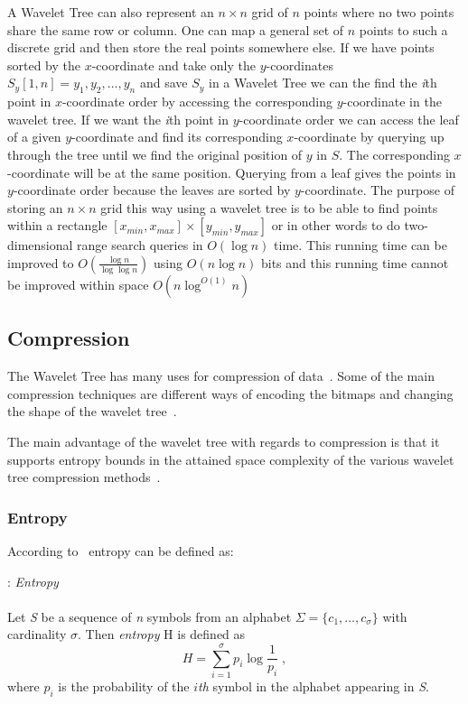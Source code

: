 A Wavelet Tree can also represent an $n \times n$ grid of $n$ points where no two points share the same row or column. 
One can map a general set of $n$ points to such a discrete grid and then store the real points somewhere else. If we have points sorted by the $x$-coordinate and take only the $y$-coordinates $S_y[1,n] = y_1,y_2,...,y_n$ and save $S_y$ in a Wavelet Tree we can the find the \textit{i}th point in $x$-coordinate order by accessing the corresponding $y$-coordinate in the wavelet tree. 
If we want the \textit{i}th point in $y$-coordinate order we can access the leaf of a given $y$-coordinate and find its corresponding $x$-coordinate by querying up through the tree until we find the original position of $y$ in $S$. 
The corresponding $x$-coordinate will be at the same position.
Querying from a leaf gives the points in $y$-coordinate order because the leaves are sorted by $y$-coordinate.
The purpose of storing an $n \times n$ grid this way using a wavelet tree is to be able to find points within a rectangle $[ x_{min}, x_{max} ] \times [ y_{min}, y_{max} ]$ or in other words to do two-dimensional range search queries in $O(\log n)$ time.
This running time can be improved to $O(\frac{\log n}{\log \log n})$ using $O(n \log n)$ bits and this running time cannot be improved within space $O(n \log^{O(1)} n)$ 

\subsection{Compression}
The Wavelet Tree has many uses for compression of data~.
Some of the main compression techniques are different ways of encoding the bitmaps and changing the shape of the wavelet tree~.

The main advantage of the wavelet tree with regards to compression is that it supports entropy bounds in the attained space complexity of the various wavelet tree compression methods~.

\subsubsection{Entropy}
\label{sec:entropy}
According to~ entropy can be defined as:

\begin{mdframed}[nobreak, linecolor=lightgray, linewidth=2pt]
\begin{definition}: \emph{Entropy} \\\\
Let \textit{S} be a sequence of \textit{n} symbols from an alphabet $\Sigma = \lbrace c_1, \ldots, c_\sigma \rbrace$ with cardinality $\sigma$.
Then \textit{entropy} H is defined as
\[
	H = \sum_{i=1}^{\sigma} p_i \log \frac{1}{p_i} \; ,
\]
where $p_i$ is the probability of the $i$\emph{th} symbol in the alphabet appearing in \textit{S}.
\end{definition} 
\end{mdframed}

